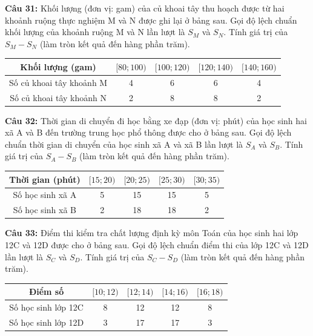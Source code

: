 \documentclass[12pt]{article}
\begin{document}
	\vspace{4mm}
	
	\noindent \textbf{Câu 31:} Khối lượng (đơn vị: gam) của củ khoai tây thu hoạch được từ hai khoảnh ruộng thực nghiệm M và N được ghi lại ở bảng sau. Gọi độ lệch chuẩn khối lượng của khoảnh ruộng M và N lần lượt là $S_M$ và $S_N$. Tính giá trị của $S_M - S_N$ (làm tròn kết quả đến hàng phần trăm).
	\begin{center}
		\renewcommand{\arraystretch}{1.3}
		\begin{tabular}{|c|c|c|c|c|}
			\hline
			Khối lượng (gam) & $[80; 100)$ & $[100; 120)$ & $[120; 140)$ & $[140; 160)$ \\
			\hline
			Số củ khoai tây khoảnh M & 4 & 6 & 6 & 4 \\
			\hline
			Số củ khoai tây khoảnh N & 2 & 8 & 8 & 2 \\
			\hline
		\end{tabular}
	\end{center}
	
	\vspace{4mm}
	
	\noindent \textbf{Câu 32:} Thời gian di chuyển đi học bằng xe đạp (đơn vị: phút) của học sinh hai xã A và B đến trường trung học phổ thông được cho ở bảng sau. Gọi độ lệch chuẩn thời gian di chuyển của học sinh xã A và xã B lần lượt là $S_A$ và $S_B$. Tính giá trị của $S_A - S_B$ (làm tròn kết quả đến hàng phần trăm).
	\begin{center}
		\renewcommand{\arraystretch}{1.3}
		\begin{tabular}{|c|c|c|c|c|}
			\hline
			Thời gian (phút) & $[15; 20)$ & $[20; 25)$ & $[25; 30)$ & $[30; 35)$ \\
			\hline
			Số học sinh xã A & 5 & 15 & 15 & 5 \\
			\hline
			Số học sinh xã B & 2 & 18 & 18 & 2 \\
			\hline
		\end{tabular}
	\end{center}
	
	\vspace{4mm}
	
	\noindent \textbf{Câu 33:} Điểm thi kiểm tra chất lượng định kỳ môn Toán của học sinh hai lớp 12C và 12D được cho ở bảng sau. Gọi độ lệch chuẩn điểm thi của lớp 12C và 12D lần lượt là $S_C$ và $S_D$. Tính giá trị của $S_C - S_D$ (làm tròn kết quả đến hàng phần trăm).
	\begin{center}
		\renewcommand{\arraystretch}{1.3}
		\begin{tabular}{|c|c|c|c|c|}
			\hline
			Điểm số & $[10; 12)$ & $[12; 14)$ & $[14; 16)$ & $[16; 18)$ \\
			\hline
			Số học sinh lớp 12C & 8 & 12 & 12 & 8 \\
			\hline
			Số học sinh lớp 12D & 3 & 17 & 17 & 3 \\
			\hline
		\end{tabular}
	\end{center}
	
\end{document}
